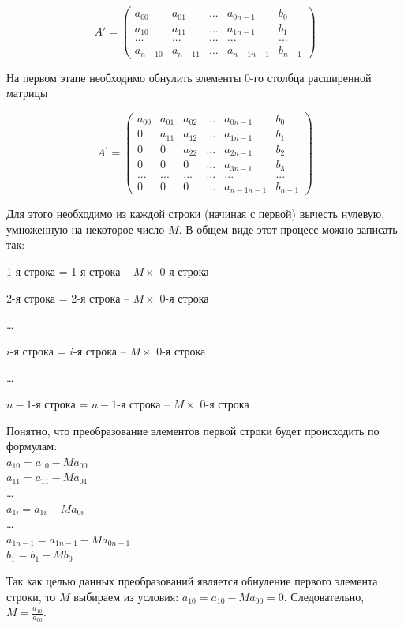 \begin{equation}\label{ch06:prg1a}
A'=\left(\begin{matrix}
a_{00}&a_{01}&...&a_{0n-1}&b_0\\
a_{10}&a_{11}&...&a_{1n-1}&b_1\\
...&...&...&...&...\\
a_{n-10}&a_{n-11}&...&a_{n-1n-1}&b_{n-1}
\end{matrix}\right)
\end{equation}

На первом этапе необходимо обнулить элементы 0-го столбца расширенной матрицы 

\begin{equation}\label{ch06:prg2a}
A^{'}=\left(\begin{matrix}
a_{00}&a_{01}&a_{02}&...&a_{0n-1}&b_0\\
0&a_{11}&a_{12}&...&a_{1n-1}&b_1\\
0&0&a_{22}&...&a_{2n-1}&b_2\\
0&0&0&...&a_{3n-1}&b_3\\
...&...&...&...&...&...\\
0&0&0&...&a_{n-1n-1}&b_{n-1}
\end{matrix}\right)
\end{equation}

Для этого необходимо из каждой строки (начиная с первой) вычесть нулевую, умноженную на некоторое число $M$. В
общем виде этот процесс можно записать так:

1-я строка = 1-я строка -- $M\times$ 0-я строка

2-я строка = 2-я строка -- $M\times$ 0-я строка

…

$i$-я строка = $i$-я строка -- $M\times$ 0-я строка

…

$n-1$-я строка = $n-1$-я строка -- $M\times$ 0-я строка

Понятно, что преобразование элементов первой строки будет происходить по формулам:\\
$a_{10}=a_{10}-Ma_{00}$ \\
$a_{11}=a_{11}-Ma_{01}$\\
 …  \\
$a_{1i}=a_{1i}-Ma_{0i}$\\
 … \\
$a_{1n-1}=a_{1n-1}-Ma_{0n-1}$\\
$b_1=b_1-Mb_0$ 

Так как целью данных преобразований является обнуление первого элемента строки, то $M$ выбираем из условия: 
$a_{10}=a_{10}-Ma_{00}=0$. Следовательно,  $M=\frac{a_{10}}{a_{00}}$.


